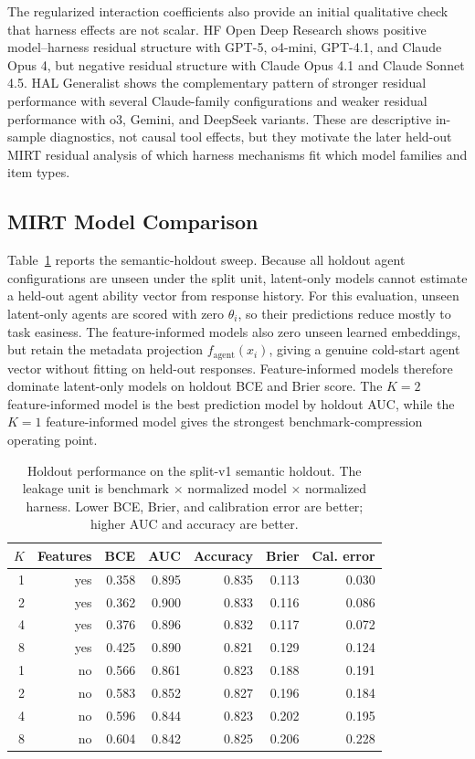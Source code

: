 \documentclass{article}
\begin{document}
The regularized interaction coefficients also provide an initial qualitative check that harness effects are not scalar. HF Open Deep Research shows positive model--harness residual structure with GPT-5, o4-mini, GPT-4.1, and Claude Opus 4, but negative residual structure with Claude Opus 4.1 and Claude Sonnet 4.5. HAL Generalist shows the complementary pattern of stronger residual performance with several Claude-family configurations and weaker residual performance with o3, Gemini, and DeepSeek variants. These are descriptive in-sample diagnostics, not causal tool effects, but they motivate the later held-out MIRT residual analysis of which harness mechanisms fit which model families and item types.

\subsection{MIRT Model Comparison}

Table~\ref{tab:mirt-sweep} reports the semantic-holdout sweep. Because all
holdout agent configurations are unseen under the split unit, latent-only
models cannot estimate a held-out agent ability vector from response history.
For this evaluation, unseen latent-only agents are scored with zero
$\theta_i$, so their predictions reduce mostly to task easiness. The
feature-informed models also zero unseen learned embeddings, but retain the
metadata projection $f_{\mathrm{agent}}(x_i)$, giving a genuine cold-start
agent vector without fitting on held-out responses. Feature-informed models
therefore dominate latent-only models on holdout BCE and Brier score. The
$K=2$ feature-informed model is the best prediction model by holdout AUC,
while the $K=1$ feature-informed model gives the strongest
benchmark-compression operating point.

\begin{table}[t]
\centering
\small
\begin{tabular}{rr rrrrr}
\toprule
$K$ & Features & BCE & AUC & Accuracy & Brier & Cal. error \\
\midrule
1 & yes & 0.358 & 0.895 & 0.835 & 0.113 & 0.030 \\
2 & yes & 0.362 & 0.900 & 0.833 & 0.116 & 0.086 \\
4 & yes & 0.376 & 0.896 & 0.832 & 0.117 & 0.072 \\
8 & yes & 0.425 & 0.890 & 0.821 & 0.129 & 0.124 \\
1 & no & 0.566 & 0.861 & 0.823 & 0.188 & 0.191 \\
2 & no & 0.583 & 0.852 & 0.827 & 0.196 & 0.184 \\
4 & no & 0.596 & 0.844 & 0.823 & 0.202 & 0.195 \\
8 & no & 0.604 & 0.842 & 0.825 & 0.206 & 0.228 \\
\bottomrule
\end{tabular}
\caption{Holdout performance on the split-v1 semantic holdout. The leakage
unit is benchmark $\times$ normalized model $\times$ normalized harness. Lower
BCE, Brier, and calibration error are better; higher AUC and accuracy are
better.}
\label{tab:mirt-sweep}
\end{table}
\end{document}
